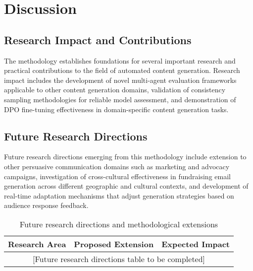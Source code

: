 \chapter{Discussion}
\label{sec:discussion}

\section{Research Impact and Contributions}
\label{sec:research-impact}

The methodology establishes foundations for several important research and practical contributions to the field of automated content generation. Research impact includes the development of novel multi-agent evaluation frameworks applicable to other content generation domains, validation of consistency sampling methodologies for reliable model assessment, and demonstration of DPO fine-tuning effectiveness in domain-specific content generation tasks.

\section{Future Research Directions}
\label{sec:future-directions}

Future research directions emerging from this methodology include extension to other persuasive communication domains such as marketing and advocacy campaigns, investigation of cross-cultural effectiveness in fundraising email generation across different geographic and cultural contexts, and development of real-time adaptation mechanisms that adjust generation strategies based on audience response feedback.

\begin{table}[htbp]
    \centering
    \caption{Future research directions and methodological extensions}
    \label{tab:future-research}
    \begin{tabular}{|l|l|l|}
    \hline
    \textbf{Research Area} & \textbf{Proposed Extension} & \textbf{Expected Impact} \\
    \hline
    \multicolumn{3}{|c|}{[Future research directions table to be completed]} \\
    \hline
    \end{tabular}
\end{table}

\lipsum